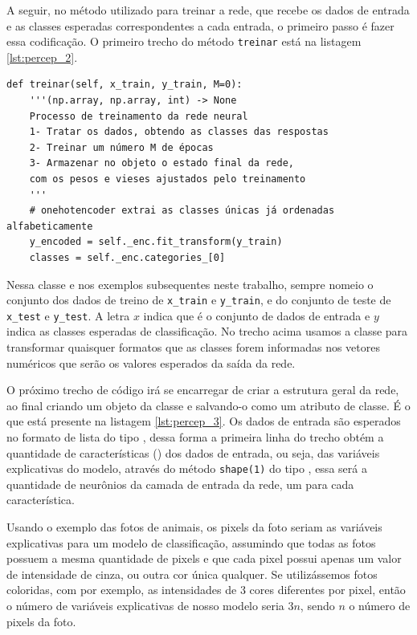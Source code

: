 A seguir, no método utilizado para treinar a rede, que recebe os dados de entrada e as classes esperadas correspondentes a cada entrada, o primeiro passo é fazer essa codificação. O primeiro trecho do método \texttt{treinar} está na listagem \ref{lst:percep_2}.

\begin{scriptsize}
\estiloR
\begin{lstlisting}[caption={Trecho da classe \eng{Perceptron}}, label={lst:percep_2}, escapeinside={\%}]
def treinar(self, x_train, y_train, M=0):
    '''(np.array, np.array, int) -> None
    Processo de treinamento da rede neural
    1- Tratar os dados, obtendo as classes das respostas
    2- Treinar um número M de épocas
    3- Armazenar no objeto o estado final da rede, 
    com os pesos e vieses ajustados pelo treinamento
    '''
    # onehotencoder extrai as classes únicas já ordenadas alfabeticamente
    y_encoded = self._enc.fit_transform(y_train)
    classes = self._enc.categories_[0]
\end{lstlisting}
\end{scriptsize}

Nessa classe e nos exemplos subsequentes neste trabalho, sempre nomeio o conjunto dos dados de treino de \texttt{x\_train} e \texttt{y\_train}, e do conjunto de teste de \texttt{x\_test} e \texttt{y\_test}. A letra $x$ indica que é o conjunto de dados de entrada e $y$ indica as classes esperadas de classificação. No trecho acima usamos a classe  para transformar quaisquer formatos que as classes forem informadas nos vetores numéricos que serão os valores esperados da saída da rede.

O próximo trecho de código irá se encarregar de criar a estrutura geral da rede, ao final criando um objeto da classe  e salvando-o como um atributo de classe. É o que está presente na listagem \ref{lst:percep_3}. Os dados de entrada são esperados no formato de lista do tipo , dessa forma a primeira linha do trecho obtém a quantidade de características () dos dados de entrada, ou seja, das variáveis explicativas do modelo, através do método \texttt{shape(1)} do tipo , essa será a quantidade de neurônios da camada de entrada da rede, um para cada característica.

Usando o exemplo das fotos de animais, os pixels da foto seriam as variáveis explicativas para um modelo de classificação, assumindo que todas as fotos possuem a mesma quantidade de pixels e que cada pixel possui apenas um valor de intensidade de cinza, ou outra cor única qualquer. Se utilizássemos fotos coloridas, com por exemplo, as intensidades de $3$ cores diferentes por pixel, então o número de variáveis explicativas de nosso modelo seria $3n$, sendo $n$ o número de pixels da foto.


